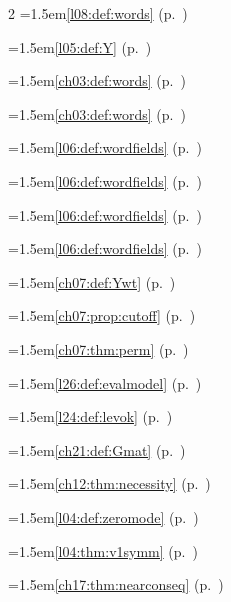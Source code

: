 \begin{multicols}{2}
\hangindent=1.5em\quad \ref{l08:def:words} (p.~\pageref{l08:def:words})\par
\hangindent=1.5em\quad \ref{l05:def:Y} (p.~\pageref{l05:def:Y})\par
\hangindent=1.5em\quad \ref{ch03:def:words} (p.~\pageref{ch03:def:words})\par
\hangindent=1.5em\quad \ref{ch03:def:words} (p.~\pageref{ch03:def:words})\par
\hangindent=1.5em\quad \ref{l06:def:wordfields} (p.~\pageref{l06:def:wordfields})\par
\hangindent=1.5em\quad \ref{l06:def:wordfields} (p.~\pageref{l06:def:wordfields})\par
\hangindent=1.5em\quad \ref{l06:def:wordfields} (p.~\pageref{l06:def:wordfields})\par
\hangindent=1.5em\quad \ref{l06:def:wordfields} (p.~\pageref{l06:def:wordfields})\par
\hangindent=1.5em\quad \ref{ch07:def:Ywt} (p.~\pageref{ch07:def:Ywt})\par
\hangindent=1.5em\quad \ref{ch07:prop:cutoff} (p.~\pageref{ch07:prop:cutoff})\par
\hangindent=1.5em\quad \ref{ch07:thm:perm} (p.~\pageref{ch07:thm:perm})\par
\par{}\par\nopagebreak\smallskip
\hangindent=1.5em\quad \ref{l26:def:evalmodel} (p.~\pageref{l26:def:evalmodel})\par
\hangindent=1.5em\quad \ref{l24:def:levok} (p.~\pageref{l24:def:levok})\par
\hangindent=1.5em\quad \ref{ch21:def:Gmat} (p.~\pageref{ch21:def:Gmat})\par
\hangindent=1.5em\quad \ref{ch12:thm:necessity} (p.~\pageref{ch12:thm:necessity})\par
\hangindent=1.5em\quad \ref{l04:def:zeromode} (p.~\pageref{l04:def:zeromode})\par
\hangindent=1.5em\quad \ref{l04:thm:v1symm} (p.~\pageref{l04:thm:v1symm})\par
\hangindent=1.5em\quad \ref{ch17:thm:nearconseq} (p.~\pageref{ch17:thm:nearconseq})\par

\end{multicols}
